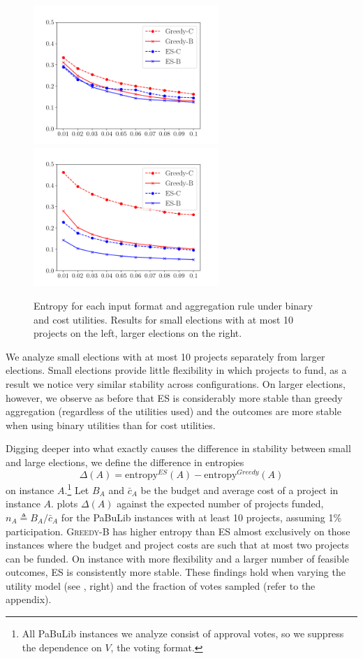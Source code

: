 \documentclass[mnsc,blindrev]{informs3_freeuse} %
\newcommand{\mes}{ES}
\newcommand{\pabu}{PaBuLib}
\newcommand{\bingreedy}{\textsc{Greedy-B}}
\begin{document}
\begin{figure}[!h]
\begin{center}
\includegraphics[width=7cm]{../experiment/entropy_pabu_small.png}
\includegraphics[width=7cm]{../experiment/entropy_pabu_large.png}
\caption{Entropy for each input format  and aggregation rule under binary and cost utilities. Results for small elections with at most 10  projects on the left, larger elections on the right. 
}\label{fig:pabulib:stability}
\end{center}
\vspace{-3mm}
\end{figure}

We analyze small elections with at most 10 projects separately from larger elections. 
Small elections provide little flexibility in which projects to fund, as a result we notice very similar stability across configurations. 
On larger elections, however,  we observe as before that \mes{} is considerably more stable than greedy aggregation (regardless of the utilities used) and the outcomes are more stable when using binary utilities than for cost utilities. 


Digging deeper into what exactly causes the difference in stability   between small and large elections, we define the difference in entropies 
\[
\Delta(A) = \text{entropy}^{\mes}( A) -  \text{entropy}^{Greedy}( A)
\]
on instance $A$.\footnote{All   \pabu{} instances we analyze consist of approval votes, so we suppress the dependence on $V$, the voting format.} 
Let $B_A$ and $\bar{c}_A$ be the budget and average cost of a project in instance $A$. 
 plots  $\Delta(A)$ against the expected number of projects funded, $n_A \triangleq B_A / \bar{c}_A$ for the  \pabu{} instances with at least 10 projects, assuming 1\% participation.
\bingreedy{} has higher entropy than \mes{} almost exclusively on those instances where the budget and project costs are such that at most two projects can be funded. On instance with more flexibility and a larger number of feasible outcomes, \mes{}  is consistently more stable. These findings hold when varying the utility model (see , right) and the fraction of votes sampled (refer to the appendix). 
\end{document}
